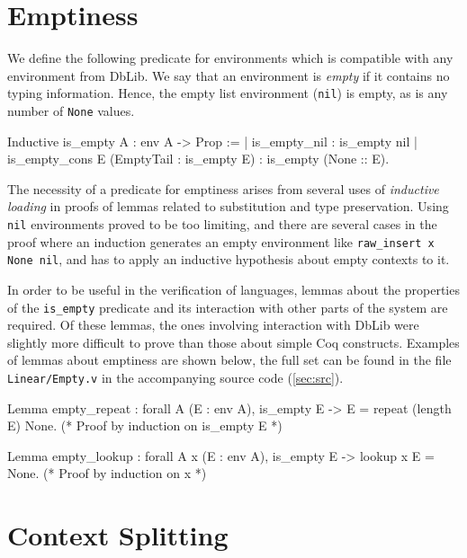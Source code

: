 \documentclass[]{unswthesis}
\let\c\texttt
\let\i\textit
\begin{document}
\section{Emptiness}
\label{sec:emptiness}

We define the following predicate for environments which is compatible with any environment from DbLib. We say that an environment is \i{empty} if it contains no typing information. Hence, the empty list environment (\c{nil}) is empty, as is any number of \c{None} values.

\begin{coqcode}
Inductive is_empty {A} : env A -> Prop :=
  | is_empty_nil : is_empty nil
  | is_empty_cons E (EmptyTail : is_empty E) : is_empty (None :: E).
\end{coqcode}

The necessity of a predicate for emptiness arises from several uses of \i{inductive loading} in proofs of lemmas related to substitution and type preservation. Using \c{nil} environments proved to be too limiting, and there are several cases in the proof where an induction generates an empty environment like \c{raw_insert x None nil}, and has to apply an inductive hypothesis about empty contexts to it.

In order to be useful in the verification of languages, lemmas about the properties of the \c{is_empty} predicate and its interaction with other parts of the system are required. Of these lemmas, the ones involving interaction with DbLib were slightly more difficult to prove than those about simple Coq constructs. Examples of lemmas about emptiness are shown below, the full set can be found in the file \c{Linear/Empty.v} in the accompanying source code (\cref{sec:src}).

\begin{coqcode}
Lemma empty_repeat : forall A (E : env A),
  is_empty E ->
  E = repeat (length E) None.
(* Proof by induction on is_empty E *)

Lemma empty_lookup : forall A x (E : env A),
  is_empty E ->
  lookup x E = None.
(* Proof by induction on x *)
\end{coqcode}

\section{Context Splitting}
\label{sec:context-splitting}

\end{document}
